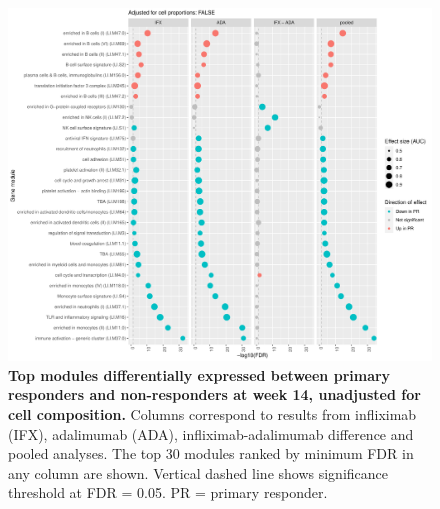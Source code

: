 \begin{figure}
    \centering
    \includegraphics[width=1.0\textwidth,page=1]{mainmatter/figures/chapter_04/plot_gene_set_enrichment.tmodCERNO_panelplot_reversed_C_3RI_3NI,C_3RA_3NA,C_(3RI_3NI)_(3RA_3NA),C_3R_3N.cell_prop_correction_FALSE.pdf}
    \caption{
        \textbf{Top modules differentially expressed between primary responders and non-responders at week 14, unadjusted for cell composition.}
        Columns correspond to results from infliximab (IFX), adalimumab (ADA), infliximab-adalimumab difference and pooled analyses. 
        The top 30 modules ranked by minimum \gls{FDR} in any column are shown. Vertical dashed line shows significance threshold at FDR = 0.05.
        PR = primary responder.
    }
    \label{fig:multipants_dge_panelPlot_week_14_R_N_cellPropF}
\end{figure}


